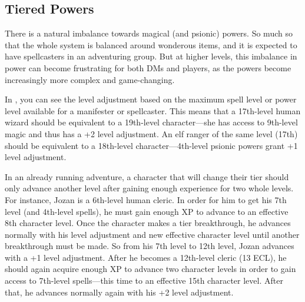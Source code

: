 \subsection{Tiered Powers}
There is a natural imbalance towards magical (and psionic) powers. So much so that the whole system is balanced around wonderous items, and it is expected to have spellcasters in an adventuring group. But at higher levels, this imbalance in power can become frustrating for both DMs and players, as the powers become increasingly more complex and game-changing.

In , you can see the level adjustment based on the maximum spell level or power level available for a manifester or spellcaster. This means that a 17th-level human wizard should be equivalent to a 19th-level character---she has access to 9th-level magic and thus has a +2 level adjustment. An elf ranger of the same level (17th) should be equivalent to a 18th-level character---4th-level psionic powers grant +1 level adjustment.


In an already running adventure, a character that will change their tier should only advance another level after gaining enough experience for two whole levels. For instance, Jozan is a 6th-level human cleric. In order for him to get his 7th level (and 4th-level spells), he must gain enough XP to advance to an effective 8th character level. Once the character makes a tier breakthrough, he advances normally with his level adjustment and new effective character level until another breakthrough must be made. So from his 7th level to 12th level, Jozan advances with a +1 level adjustment. After he becomes a 12th-level cleric (13 ECL), he should again acquire enough XP to advance two character levels in order to gain access to 7th-level spells---this time to an effective 15th character level. After that, he advances normally again with his +2 level adjustment.